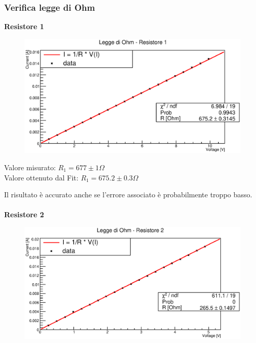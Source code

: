 \subsubsection{Verifica legge di Ohm}
%
% 
%   
\textbf{Resistore 1}\\
%
    
%
    \begin{figure}[H]
    \centering
    \includegraphics[scale=.8]{Grafici/C1_P1_ohmR1.eps}
    \label{fig:C1_P1_OhmR1}
    \end{figure} 
%
    \begin{center}
    Valore misurato: $R_1 = 677 \pm 1  \Omega$  \\
    Valore ottenuto dal Fit: $R_1 = 675.2 \pm 0.3 \Omega$ \\
    \end{center}
%
    Il risultato è accurato anche se l'errore associato è probabilmente troppo basso.\\\\
%
% 
%
%
%
\textbf{Resistore 2}\\
%
    
%
    \begin{figure}[H]
    \centering
    \includegraphics[scale=.8]{Grafici/C1_P1_ohmR2.eps}
    \label{fig:C1_P1_OhmR2}
    \end{figure}
